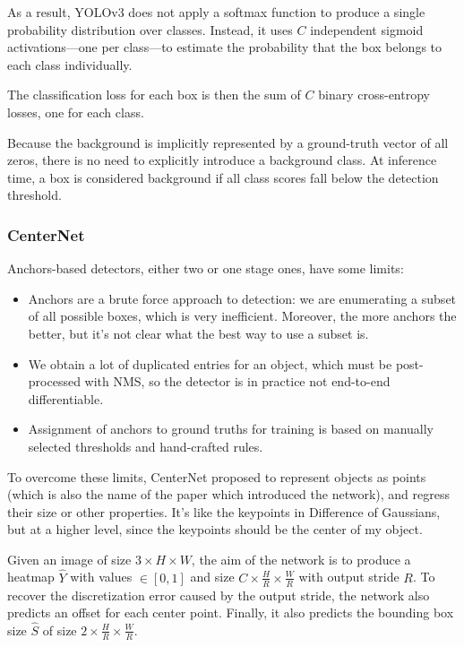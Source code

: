 As a result, YOLOv3 does not apply a softmax function to produce a single probability distribution over classes. Instead, it uses $C$ independent sigmoid activations—one per class—to estimate the probability that the box belongs to each class individually.

The classification loss for each box is then the sum of $C$ binary cross-entropy losses, one for each class.

Because the background is implicitly represented by a ground-truth vector of all zeros, there is no need to explicitly introduce a background class. At inference time, a box is considered background if all class scores fall below the detection threshold.

\subsubsection{CenterNet}
Anchors-based detectors, either two or one stage ones, have some limits:
\begin{itemize}
  \item Anchors are a brute force approach to detection: we are enumerating a subset of all possible boxes, which is very inefficient.
  Moreover, the more anchors the better, but it's not clear what the best way to use a subset is.
  \item We obtain a lot of duplicated entries for an object, which must be post-processed with NMS, so the detector is in practice not end-to-end differentiable.
  \item Assignment of anchors to ground truths for training is based on manually selected thresholds and hand-crafted rules.
\end{itemize}

To overcome these limits, CenterNet proposed to represent objects as points (which is also the name of the paper which introduced the network), and regress their size or other properties.
It's like the keypoints in Difference of Gaussians, but at a higher level, since the keypoints should be the center of my object.

Given an image of size $3 \times H \times W$, the aim of the network is to produce a heatmap $\hat{Y}$ with values $\in [0,1]$ and size $C \times \frac{H}{R} \times \frac{W}{R}$ with output stride $R$.
To recover the discretization error caused by the output stride, the network also predicts an offset for each center point.
Finally, it also predicts the bounding box size $\hat{S}$ of size $2 \times \frac{H}{R} \times \frac{W}{R}$.

